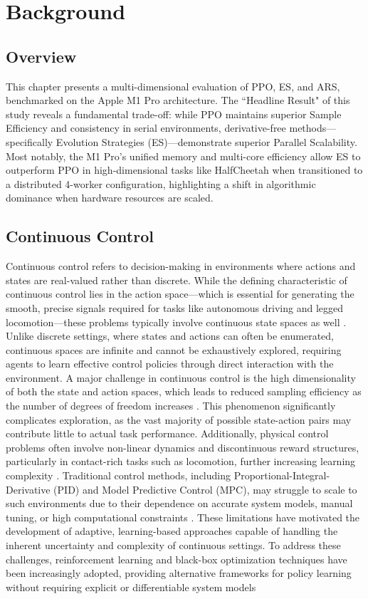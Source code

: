 
%
%
\chapter{Background}
\label{chap:02}
\setlength{\parskip}{1em}
%
\section{Overview}
This chapter presents a multi-dimensional evaluation of PPO, ES, and ARS, benchmarked on the Apple M1 Pro architecture. The ``Headline Result" of this study reveals a fundamental trade-off: while PPO maintains superior Sample Efficiency and consistency in serial environments, derivative-free methods—specifically Evolution Strategies (ES)—demonstrate superior Parallel Scalability. Most notably, the M1 Pro’s unified memory and multi-core efficiency allow ES to outperform PPO in high-dimensional tasks like HalfCheetah when transitioned to a distributed 4-worker configuration, highlighting a shift in algorithmic dominance when hardware resources are scaled.
\section{Continuous Control}
Continuous control refers to decision-making in environments where actions and states are real-valued rather than discrete. While the defining characteristic of continuous control lies in the action space—which is essential for generating the smooth, precise signals required for tasks like autonomous driving and legged locomotion—these problems typically involve continuous state spaces as well \citep{seif2016autonomous,smith2021legged}. Unlike discrete settings, where states and actions can often be enumerated, continuous spaces are infinite and cannot be exhaustively explored, requiring agents to learn effective control policies through direct interaction with the environment.
A major challenge in continuous control is the high dimensionality of both the state and action spaces, which leads to reduced sampling efficiency as the number of degrees of freedom increases \citep{wang2017continuous}. This phenomenon significantly complicates exploration, as the vast majority of possible state-action pairs may contribute little to actual task performance. Additionally, physical control problems often involve non-linear dynamics and discontinuous reward structures, particularly in contact-rich tasks such as locomotion, further increasing learning complexity \citep{shahid2022manipulation}.
Traditional control methods, including Proportional-Integral-Derivative (PID) and Model Predictive Control (MPC), may struggle to scale to such environments due to their dependence on accurate system models, manual tuning, or high computational constraints \citep{wang2017continuous}. These limitations have motivated the development of adaptive, learning-based approaches capable of handling the inherent uncertainty and complexity of continuous settings. To address these challenges, reinforcement learning and black-box optimization techniques have been increasingly adopted, providing alternative frameworks for policy learning without requiring explicit or differentiable system models

